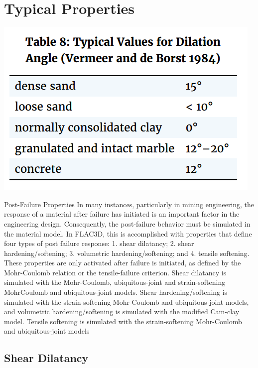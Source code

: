 \documentclass[a4paper, nobind]{templates/ociamthesis}
\begin{document}
\hypertarget{typical-properties}{%
\section{Typical Properties}\label{typical-properties}}

\includegraphics[width=1\linewidth]{myfigureeeeee/typical_dilation}

Post-Failure Properties In many instances, particularly in mining
engineering, the response of a material after failure has initiated is
an important factor in the engineering design. Consequently, the
post-failure behavior must be simulated in the material model. In
FLAC3D, this is accomplished with properties that define four types of
post failure response: 1. shear dilatancy; 2. shear hardening/softening;
3. volumetric hardening/softening; and 4. tensile softening. These
properties are only activated after failure is initiated, as defined by
the Mohr-Coulomb relation or the tensile-failure criterion. Shear
dilatancy is simulated with the Mohr-Coulomb, ubiquitous-joint and
strain-softening MohrCoulomb and ubiquitous-joint models. Shear
hardening/softening is simulated with the strain-softening Mohr-Coulomb
and ubiquitous-joint models, and volumetric hardening/softening is
simulated with the modified Cam-clay model. Tensile softening is
simulated with the strain-softening Mohr-Coulomb and ubiquitous-joint
models

\hypertarget{shear-dilatancy}{%
\subsection{Shear Dilatancy}\label{shear-dilatancy}}
\end{document}
